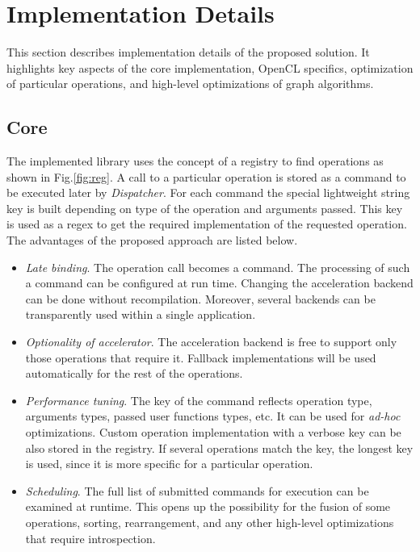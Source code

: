 \section{Implementation Details}

This section describes implementation details of the proposed solution. 
It highlights key aspects of the core implementation, OpenCL specifics, optimization of particular operations, and high-level optimizations of graph algorithms.

\subsection{Core}

The implemented library uses the concept of a registry to find operations as shown in Fig.\ref{fig:reg}. A call to a particular operation is stored as a command to be executed later by \textit{Dispatcher}. For each command the special lightweight string key is built depending on type of the operation and arguments passed. This key is used as a regex to get the required implementation of the requested operation. The advantages of the proposed approach are listed below.

\begin{itemize}
    \item \textit{Late binding}. The operation call becomes a command. The processing of such a command can be configured at run time. Changing the acceleration backend can be done without recompilation. Moreover, several backends can be transparently used within a single application.
    \item \textit{Optionality of accelerator}. The acceleration backend is free to support only those operations that require it. Fallback implementations will be used automatically for the rest of the operations.
    \item \textit{Performance tuning}. The key of the command reflects operation type, arguments types, passed user functions types, etc. It can be used for \textit{ad-hoc} optimizations. Custom operation implementation with a verbose key can be also stored in the registry. If several operations match the key, the longest key is used, since it is more specific for a particular operation.
    \item \textit{Scheduling}. The full list of submitted commands for execution can be examined at runtime. This opens up the possibility for the fusion of some operations, sorting, rearrangement, and any other high-level optimizations that require introspection.
\end{itemize}

